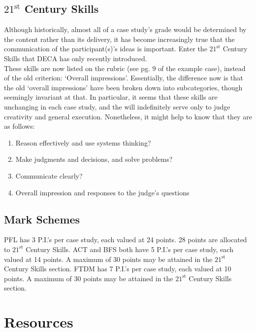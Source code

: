 \documentclass[12pt]{article}
\begin{document}
\subsection{$\textrm{21}^{\textrm{st}}$ Century Skills}

	Although historically, almost all of a case study's grade would be determined by the content rather than its delivery, it has become increasingly true that the communication of the participant(s)'s ideas is important. Enter the $\textrm{21}^{\textrm{st}}$ Century Skills that DECA has only recently introduced. \\
	
	These skills are now listed on the rubric (see pg. 9 of the example case), instead of the old criterion: \lq Overall impressions'. Essentially, the difference now is that the old \lq overall impressions' have been broken down into subcategories, though seemingly invariant at that. In particular, it seems that these skills are unchanging in each case study, and the will indefinitely serve only to judge creativity and general execution. Nonetheless, it might help to know that they are as follows: 
	
\begin{enumerate}
		\item{Reason effectively and use systems thinking?}
		\item{Make judgments and decisions, and
solve problems?}
		\item{Communicate clearly?}
		\item{Overall impression and responses to
the judge’s questions}
\end{enumerate} 
	
\subsection{Mark Schemes}

	PFL has 3 P.I.'s per case study, each valued at 24 points. 28 points are allocated to $\textrm{21}^{\textrm{st}}$  Century Skills. ACT and BFS both have 5 P.I.'s per case study, each valued at 14 points. A maximum of 30 points may be attained in the $\textrm{21}^{\textrm{st}}$ Century Skills section. FTDM has 7 P.I.'s per case study, each valued at 10 points. A maximum of 30 points may be attained in the $\textrm{21}^{\textrm{st}}$ Century Skills section. \\

\section{Resources}
\end{document}
